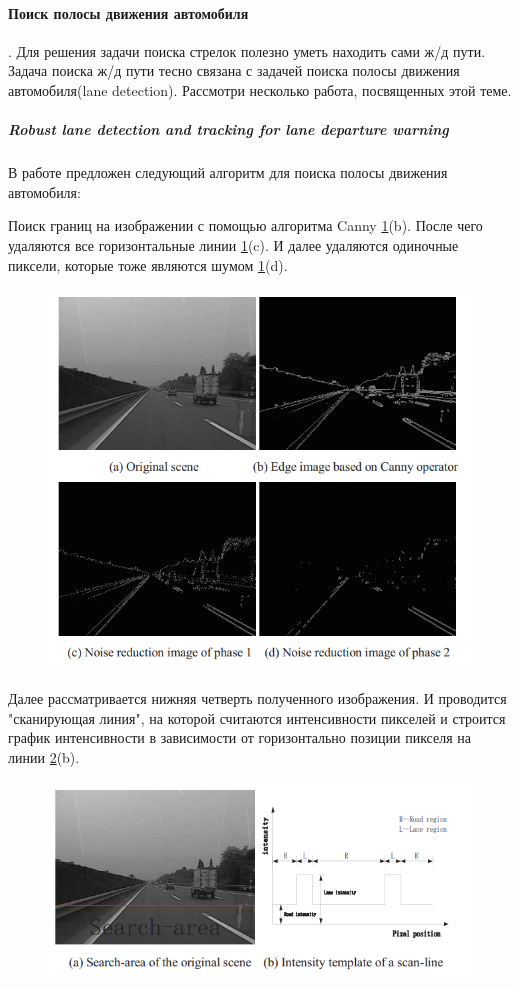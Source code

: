 \paragraph{Поиск полосы движения автомобиля \cite{b:lane_detection}}.
Для решения задачи поиска стрелок полезно уметь находить сами ж/д пути.
Задача поиска ж/д пути тесно связана с задачей поиска полосы движения автомобиля(lane detection). Рассмотри несколько работа, посвященных этой теме.

\subparagraph{Robust lane detection and tracking for lane departure warning}
В работе \cite{b:lane_detection} предложен следующий алгоритм для поиска полосы движения автомобиля:

Поиск границ на изображении с помощью алгоритма Canny \ref{fig:screenshot00232}(b).
После чего удаляются все горизонтальные линии \ref{fig:screenshot00232}(c). И далее удаляются одиночные пиксели, которые тоже являются шумом \ref{fig:screenshot00232}(d).
\begin{figure}[!h]
	\centering
	\includegraphics[width=0.7\linewidth]{pictures/screenshot00232}
	\caption{}
	\label{fig:screenshot00232}
\end{figure}
\newpage

Далее рассматривается нижняя четверть полученного изображения. И проводится "сканирующая линия", на которой считаются интенсивности пикселей и строится график интенсивности в зависимости от горизонтально позиции пикселя на линии \ref{fig:screenshot00233}(b).
\begin{figure}[h!]
	\centering
	\includegraphics[width=1\linewidth]{pictures/screenshot00233}
	\caption{}
	\label{fig:screenshot00233}
\end{figure}
\newpage


